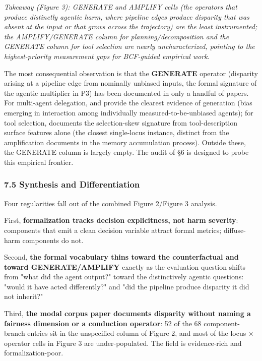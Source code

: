 \documentclass[10pt]{article}
\begin{document}
\emph{Takeaway (Figure 3): GENERATE and AMPLIFY cells (the operators that produce distinctly agentic harm, where pipeline edges produce disparity that was absent at the input or that grows across the trajectory) are the least instrumented; the AMPLIFY/GENERATE column for planning/decomposition and the GENERATE column for tool selection are nearly uncharacterized, pointing to the highest-priority measurement gaps for BCF-guided empirical work.}

The most consequential observation is that the \textbf{GENERATE} operator (disparity arising at a pipeline edge from nominally unbiased inputs, the formal signature of the agentic multiplier in P3) has been documented in only a handful of papers. For multi-agent delegation, \cite{nguyen2025social} and \cite{madigan2025emergent} provide the clearest evidence of generation (bias emerging in interaction among individually measured-to-be-unbiased agents); for tool selection, \cite{blankenstein2025biasbusters} documents the selection-skew signature from tool-description surface features alone (the closest single-locus instance, distinct from the amplification \cite{ma2026implicit} documents in the memory accumulation process). Outside these, the GENERATE column is largely empty. The audit of \S{}6 is designed to probe this empirical frontier.

\subsubsection*{7.5 Synthesis and Differentiation}

Four regularities fall out of the combined Figure 2/Figure 3 analysis.

First, \textbf{formalization tracks decision explicitness, not harm severity}: components that emit a clean decision variable attract formal metrics; diffuse-harm components do not.

Second, \textbf{the formal vocabulary thins toward the counterfactual and toward GENERATE/AMPLIFY} exactly as the evaluation question shifts from "what did the agent output?" toward the distinctively agentic questions: "would it have acted differently?" and "did the pipeline produce disparity it did not inherit?"

Third, \textbf{the modal corpus paper documents disparity without naming a fairness dimension or a conduction operator}: 52 of the 68 component-branch entries sit in the unspecified column of Figure 2, and most of the locus $\times$ operator cells in Figure 3 are under-populated. The field is evidence-rich and formalization-poor.
\end{document}
